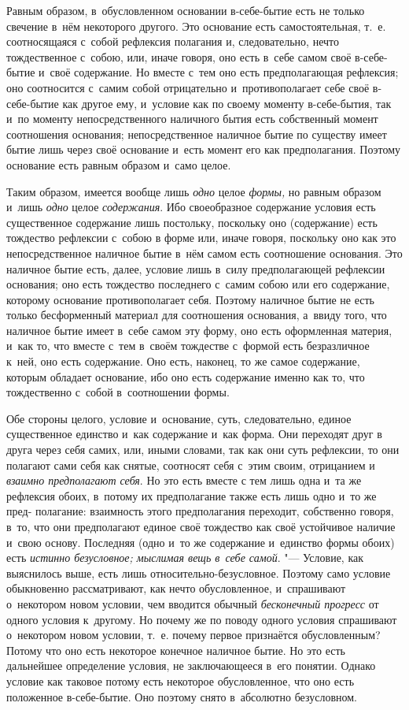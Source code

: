 Равным образом, в~обусловленном основании в-себе-бытие есть не только
свечение в~нём некоторого другого. Это основание есть самостоятельная,
т.~е. соотносящаяся с~собой рефлексия полагания и, следовательно, нечто
тождественное с~собою, или, иначе говоря, оно есть в~себе самом своё
в-себе-бытие и~своё содержание. Но вместе с~тем оно есть предполагающая
рефлексия; оно соотносится с~самим собой отрицательно и~противополагает
себе своё в-себе-бытие как другое ему, и~условие как по своему моменту
в-себе-бытия, так и~по моменту непосредственного наличного бытия есть
собственный момент соотношения основания; непосредственное наличное бытие
по существу имеет бытие лишь через своё основание и~есть момент его как
предполагания. Поэтому основание есть равным образом и~само целое.

Таким образом, имеется вообще лишь {\em одно} целое
{\em формы,} но равным образом и~лишь
{\em одно} целое {\em содержания}.
Ибо своеобразное содержание условия есть существенное содержание лишь
постольку, поскольку оно (содержание) есть тождество рефлексии с~собою в
форме или, иначе говоря, поскольку оно как это непосредственное наличное
бытие в~нём самом есть соотношение основания. Это наличное бытие есть,
далее, условие лишь в~силу предполагающей рефлексии основания; оно есть
тождество последнего с~самим собою или его содержание, которому основание
противополагает себя. Поэтому наличное бытие не есть только бесформенный
материал для соотношения основания, а~ввиду того, что наличное бытие имеет
в~себе самом эту форму, оно есть оформленная материя, и~как то, что вместе
с~тем в~своём тождестве с~формой есть безразличное к~ней, оно есть
содержание. Оно есть, наконец, то же самое содержание, которым обладает
основание, ибо оно есть содержание именно как то, что тождественно с~собой
в~соотношении формы.

Обе стороны целого, условие и~основание, суть, следовательно, единое
существенное единство и~как содержание и~как форма. Они переходят друг в
друга через себя самих, или, иными словами, так как они суть рефлексии, то
они полагают сами себя как снятые, соотносят себя с~этим своим, отрицанием
и {\em взаимно предполагают себя}. Но это есть вместе с
тем лишь одна и~та же рефлексия обоих, в~потому их предполагание также есть
лишь одно и~то же пред- полагание: взаимность этого предполагания
переходит, собственно говоря, в~то, что они предполагают единое своё
тождество как своё устойчивое наличие и~свою основу. Последняя (одно и~то
же содержание и~единство формы обоих) есть {\em истинно
безусловное; мыслимая вещь в~себе самой}. "--- Условие, как выяснилось выше,
есть лишь относительно-безусловное. Поэтому само условие обыкновенно
рассматривают, как нечто обусловленное, и~спрашивают о~некотором новом
условии, чем вводится обычный {\em бесконечный
прогресс} от одного условия к~другому. Но почему же по поводу одного
условия спрашивают о~некотором новом условии, т.~е. почему первое
признаётся обусловленным? Потому что оно есть некоторое конечное наличное
бытие. Но это есть дальнейшее определение условия, не заключающееся в~его
понятии. Однако условие как таковое потому есть некоторое обусловленное,
что оно есть положенное в-себе-бытие. Оно поэтому снято в~абсолютно
безусловном.


